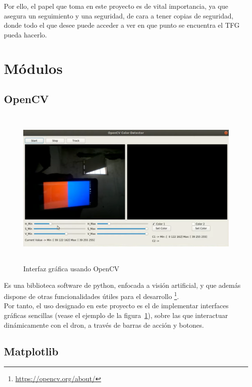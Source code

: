 Por ello, el papel que toma en este proyecto es de vital importancia, ya que asegura un seguimiento y una seguridad, de cara a tener copias de seguridad, donde todo el que desee puede acceder a ver en que punto se encuentra el \ac{TFG} pueda hacerlo.\\

\section{Módulos}
\label{sec:modulos}

\subsection{OpenCV}
\label{subsec:opencv}

\begin{figure} [t]
	\begin{center}
	\includegraphics[height=8cm]{imagenes/cap3/5_opencv_example.png}
	\end{center}
	\caption[Interfaz gráfica usando OpenCV]{Interfaz gráfica usando OpenCV}
	\label{fig:opencv}
\end{figure}

Es una biblioteca software de python, enfocada a visión artificial, y que además dispone de otras funcionalidades útiles para el desarrollo \footnote[11]{\url{https://opencv.org/about/}}.\\

Por tanto, el uso designado en este proyecto es el de implementar interfaces gráficas sencillas (vease el ejemplo de la figura~\ref{fig:opencv}), sobre las que interactuar dinámicamente con el dron, a través de barras de acción y botones.

\subsection{Matplotlib}
\label{subsec:matplotlib}

